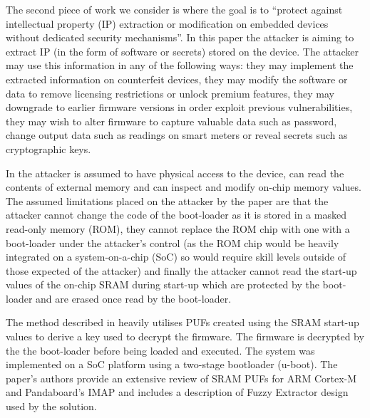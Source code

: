 The second piece of work we consider is \cite{Schaller2014} where the goal is to ``protect against intellectual property (IP) extraction or modification on embedded devices without dedicated security mechanisms''. In this paper the attacker is aiming to extract IP (in the form of software or secrets) stored on the device. The attacker may use this information in any of the following ways: they may implement the extracted information on counterfeit devices, they may modify the software or data to remove licensing restrictions or unlock premium features, they may downgrade to earlier firmware versions  in order exploit previous vulnerabilities, they may wish to alter firmware to capture valuable data such as password, change output data such as readings on smart meters or reveal secrets such as cryptographic keys.

\ifnotesincluded
{}
\fi

In \cite{Schaller2014} the attacker is assumed to have physical access to the device, can read the contents of external memory and can inspect and modify on-chip memory values. The assumed limitations placed on the attacker by the paper are that the attacker cannot change the code of the boot-loader as it is stored in a masked read-only memory (ROM), they cannot replace the ROM chip with one with a boot-loader under the attacker's control (as the ROM chip would be heavily integrated on a system-on-a-chip (SoC) so would require skill levels outside of those expected of the attacker) and finally the attacker cannot read the start-up values of the on-chip SRAM during start-up which are protected by the boot-loader and are erased once read by the boot-loader.

\ifnotesincluded
{}
\fi

The method described in \cite{Schaller2014} heavily utilises PUFs created using the SRAM start-up values to derive a key used to decrypt the firmware. The firmware is decrypted by the the boot-loader before being loaded and executed. The system was implemented on a SoC platform using a two-stage bootloader (u-boot). The paper's authors provide an extensive review of SRAM PUFs for ARM Cortex-M and Pandaboard's IMAP and includes a description of Fuzzy Extractor design used by the solution.

\ifnotesincluded
{}
\fi


